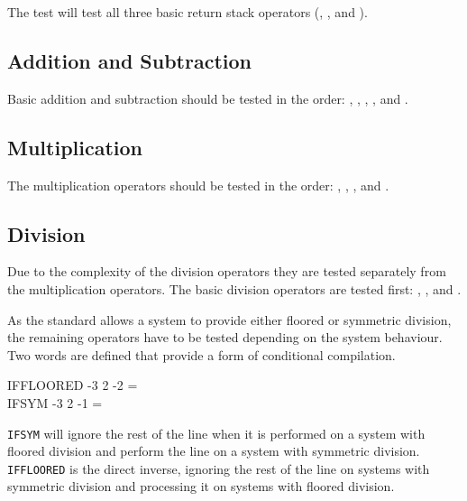 The test  will test all three basic return
stack operators (, , and ).

\subsection{Addition and Subtraction}

Basic addition and subtraction should be tested in the order:
	,
	,
	,
	,
	 and
	.

\subsection{Multiplication}

The multiplication operators should be tested in the order:
	,
	,
	, and
	.

\subsection{Division}

Due to the complexity of the division operators they are tested
separately from the multiplication operators.  The basic division
operators are tested first:
	,
	, and
	.

As the standard allows a system to provide either floored or symmetric
division, the remaining operators have to be tested depending on the
system behaviour.  Two words are defined that provide a form of
conditional compilation.

\begin{tt}
\word{:} IFFLOORED 
	\word{[} -3 2 \word{/} -2 =  \word{]}
	    
\word{;} \\
\word{:} IFSYM \tab[1.8]
	\word{[} -3 2 \word{/} -1 =  \word{]}
	    
\word{;}
\end{tt}

\texttt{IFSYM} will ignore the rest of the line when it is performed
on a system with floored division and perform the line on a system
with symmetric division.  \texttt{IFFLOORED} is the direct inverse,
ignoring the rest of the line on systems with symmetric division and
processing it on systems with floored division.

